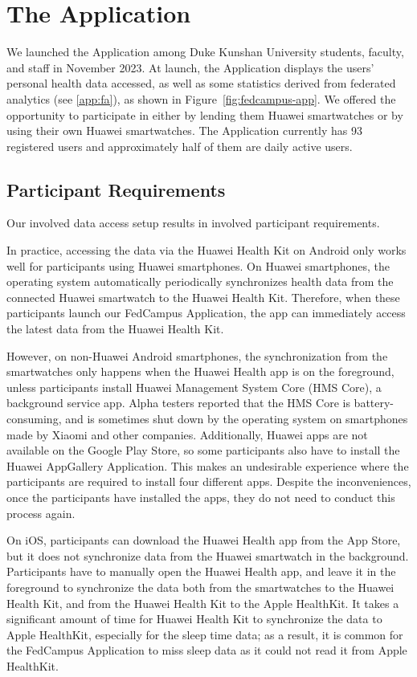 \section{The \fedcampus Application}

We launched the \fedcampus Application among Duke Kunshan University students,
faculty, and staff in November 2023.
At launch,
the \fedcampus Application displays the users' personal health data accessed,
as well as some statistics derived from federated analytics (see \ref{app:fa}),
as shown in Figure~\ref{fig:fedcampus-app}.
We offered the opportunity to participate in \fedcampus either by lending them
Huawei smartwatches or by using their own Huawei smartwatches.
The \fedcampus Application currently has 93 registered users and approximately
half of them are daily active users.

\subsection{\fedcampus Participant Requirements}

Our involved data access setup results in involved participant requirements.

In practice, accessing the data via the Huawei Health Kit on Android only works
well for participants using Huawei smartphones.
On Huawei smartphones,
the operating system automatically periodically synchronizes health data from
the connected Huawei smartwatch to the Huawei Health Kit.
Therefore, when these participants launch our FedCampus Application,
the app can immediately access the latest data from the Huawei Health Kit.

However, on non-Huawei Android smartphones,
the synchronization from the smartwatches only happens when
the Huawei Health app is on the foreground,
unless participants install Huawei Management System Core (HMS Core),
a background service app.
Alpha testers reported that the HMS Core is battery-consuming,
and is sometimes shut down by the operating system on smartphones made by
Xiaomi and other companies.
Additionally, Huawei apps are not available on the Google Play Store,
so some participants also have to install the Huawei AppGallery Application.
This makes an undesirable experience where the participants are required to
install four different apps.
Despite the inconveniences, once the participants have installed the apps,
they do not need to conduct this process again.

On iOS, participants can download the Huawei Health app from the App Store,
but it does not synchronize data from the Huawei smartwatch in the background.
Participants have to manually open the Huawei Health app,
and leave it in the foreground to synchronize the data both from
the smartwatches to the Huawei Health Kit,
and from the Huawei Health Kit to the Apple HealthKit.
It takes a significant amount of time for Huawei Health Kit to
synchronize the data to Apple HealthKit,
especially for the sleep time data;
as a result, it is common for the FedCampus Application to miss sleep data as
it could not read it from Apple HealthKit.


